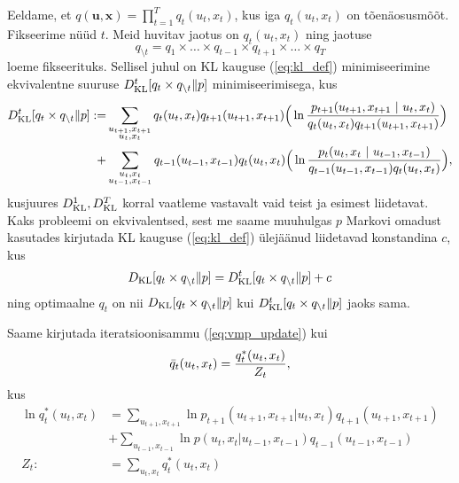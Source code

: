Eeldame, et $q(\bm{u}, \bm{x}) = \prod_{t=1}^T{q_t(u_t, x_t)}$, kus iga $q_t(u_t, x_t)$ on tõenäosusmõõt. Fikseerime nüüd $t$. Meid huvitav jaotus on $q_t(u_t, x_t)$ ning jaotuse
$$q_{\setminus t} = q_1 \times \ldots \times q_{t-1} \times q_{t+1} \times \ldots \times q_T$$
loeme fikseerituks. Sellisel juhul on KL kauguse (\ref{eq:kl_def}) minimiseerimine ekvivalentne suuruse $D_{\mathrm{KL}}^{t}[q_t \times q_{\setminus t} \| p]$ minimiseerimisega, kus
\begin{align*}
    \DKL^{t}[q_t \times q_{\setminus t} \| p] :=& \sum_{\substack{u_{t+1}, x_{t+1}\\ u_{t}, x_t}} q_t(u_{t},x_t) q_{t+1}(u_{t+1},x_{t+1}) \Big(\ln \frac{p_{t+1}(u_{t+1},x_{t+1} \ |\ u_{t}, x_t )}{q_t(u_{t},x_t)q_{t+1}(u_{t+1}, x_{t+1})}  \Big)\\
    +&\sum_{\substack{u_{t}, x_t \\ u_{t-1}, x_{t-1}}} q_{t-1}(u_{t-1},x_{t-1}) q_t(u_{t},x_t) \Big(\ln \frac{p_t(u_{t}, x_t\ |\ u_{t-1}, x_{t-1})}{q_{t-1}(u_{t-1},x_{t-1})q_t(u_{t},x_t)}\Big),
\end{align*}
kusjuures $D_{\mathrm{KL}}^{1},D_{\mathrm{KL}}^{T}$ korral vaatleme vastavalt vaid teist ja esimest liidetavat. Kaks probleemi on ekvivalentsed, sest me saame muuhulgas $p$ Markovi omadust kasutades kirjutada KL kauguse (\ref{eq:kl_def}) ülejäänud liidetavad konstandina $c$, kus
$$D_{\mathrm{KL}}[q_t \times q_{\setminus t} \| p] = D_{\mathrm{KL}}^t[q_t \times q_{\setminus t} \| p] + c$$
ning optimaalne $q_t$ on nii $D_{\mathrm{KL}}[q_t \times q_{\setminus t} \| p]$ kui $D_{\mathrm{KL}}^t[q_t \times q_{\setminus t} \| p]$ jaoks sama.

Saame kirjutada iteratsioonisammu (\ref{eq:vmp_update}) kui 
\begin{equation}
    \label{eq:vmp_implement}
    \Bar{q}_t(u_t,x_t) = \frac{ q_t^*(u_t,x_t)}{Z_t},
\end{equation}
kus
\begin{align*}
    \ln q_t^*(u_t,x_t)&=\sum_{u_{t+1},x_{t+1}}\ln p_{t+1}(u_{t+1},x_{t+1}|u_t,x_t)q_{t+1}(u_{t+1},x_{t+1}) \\
    &+ \sum_{u_{t-1},x_{t-1}}\ln p(u_{t},x _t|u_{t-1}, x_{t-1})q_{t-1}(u_{t-1}, x_{t-1})\\
    Z_t :&= \sum_{u_t,x_t} q_t^*(u_t,x_t)
\end{align*}



